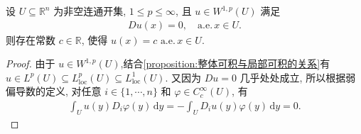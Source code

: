 \documentclass[../../main.tex]{subfiles}
\begin{document}
\begin{proposition}\label{proposition:ch05--examoi-11}
设 $U\subseteq\mathbb{R}^n$ 为非空连通开集, $1\leqslant p\leqslant\infty$, 且 $u\in W^{1,p}(U)$ 满足
\begin{align*}
Du(x)=0,
\quad \text{a.e.}\,x\in U.
\end{align*}
则存在常数 $c\in\mathbb{R}$, 使得 $u(x)=c\,\,\text{a.e.}\,x\in U.$
\end{proposition}
\begin{proof}

由于 $u\in W^{1,p}(U)$,结合\cref{proposition:整体可积与局部可积的关系}有 $u\in L^p(U)
\subseteq L^p_{\mathrm{loc}}(U) \subseteq L^1_{\mathrm{loc}}(U)$.
又因为 $Du=0$ 几乎处处成立, 所以根据弱偏导数的定义, 对任意
$i\in\{1,\cdots,n\}$ 和 $\varphi\in C_c^\infty(U)$, 有
\begin{align}
\int_Uu(y)D_i\varphi(y)\,\mathrm{d}y
=-\int_UD_i u(y)\varphi(y)\,\mathrm{d}y
=0.
\label{eqwr:Njkojioejioio2}
\end{align}


\end{proof}
\end{document}
